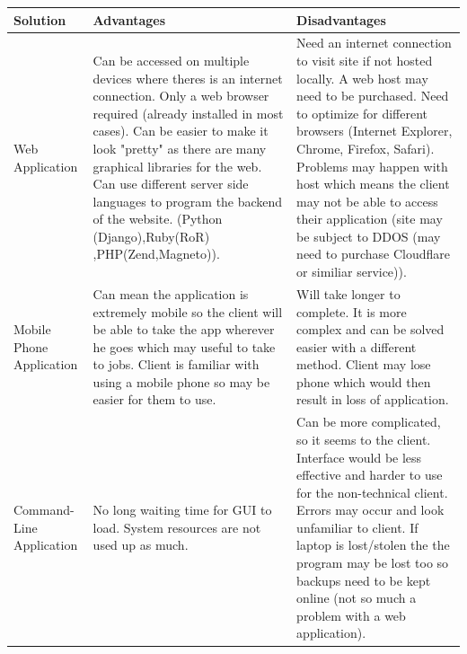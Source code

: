 \pagebreak
\begin{flushleft}
\begin{longtable}{|p{3cm}|p{4cm}|p{4cm}|}
\hline
\textbf{Solution} & \textbf{Advantages} & \textbf{Disadvantages} \\ \hline

Web Application &

{Can be accessed on multiple devices where theres is an internet connection.
Only a web browser required (already installed in most cases).
Can be easier to make it look "pretty" as there are many graphical libraries for the web.
Can use different server side languages to program the backend of the website. (Python (Django),Ruby(RoR)
\linebreak
,PHP(Zend,Magneto)).}&

{Need an internet connection to visit site if not hosted locally.
A web host may need to be purchased.
Need to optimize for different browsers (Internet Explorer, Chrome, Firefox, Safari).
Problems may happen with host which means the client may not be able to access their application (site may be subject to DDOS (may need to purchase Cloudflare or similiar service))}.

\\ \hline

Mobile Phone Application &

Can mean the application is extremely mobile so the client will be able to take the app wherever he goes which may useful to take to jobs.
Client is familiar with using a mobile phone so may be easier for them to use.&

Will take longer to complete.
It is more complex and can be solved easier with a different method.
Client may lose phone which would then result in loss of application.

\\ \hline

Command-Line Application &

No long waiting time for GUI to load.
System resources are not used up as much. &


Can be more complicated, so it seems to the client.
Interface would be less effective and harder to use for the non-technical client.
Errors may occur and look unfamiliar to client.
If laptop is lost/stolen the the program may be lost too so backups need to be kept online (not so much a problem with a web application).

\\ \hline


\end{longtable}
\end{flushleft}
